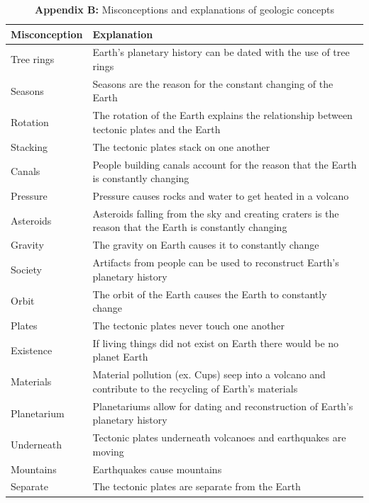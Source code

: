 \documentclass[11.5pt]{sig-alternate} %
\begin{document}
\begin{table}[th]
\caption*{\textbf{Appendix B:} Misconceptions and explanations of geologic concepts}
\begin{tabular}{ll}
\hline
\textbf{Misconception} & \textbf{Explanation} \\ \hline
Tree rings & Earth’s planetary history can be dated with the use of tree rings \\
Seasons & Seasons are the reason for the constant changing of the Earth \\
Rotation & The rotation of the Earth explains the relationship between tectonic plates and the Earth \\
Stacking & The tectonic plates stack on one another \\
Canals & People building canals account for the reason that the Earth is constantly changing \\
Pressure & Pressure causes rocks and water to get heated in a volcano \\
Asteroids & Asteroids falling from the sky and creating craters is the reason that the Earth is constantly changing \\
Gravity & The gravity on Earth causes it to constantly change \\
Society & Artifacts from people can be used to reconstruct Earth’s planetary history \\
Orbit & The orbit of the Earth causes the Earth to constantly change \\
Plates & The tectonic plates never touch one another \\
Existence & If living things did not exist on Earth there would be no planet Earth \\
Materials & Material pollution (ex. Cups) seep into a volcano and contribute to the recycling of Earth’s materials \\
Planetarium & Planetariums allow for dating and reconstruction of Earth’s planetary history \\
Underneath & Tectonic plates underneath volcanoes and earthquakes are moving \\
Mountains & Earthquakes cause mountains \\
Separate & The tectonic plates are separate from the Earth \\ \hline
\end{tabular}
\end{table}
\end{document}
